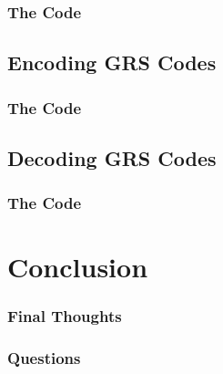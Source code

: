 \documentclass{beamer}
\begin{document}
\begin{frame}
	\frametitle{The Code}
\end{frame}

\subsection{Encoding GRS Codes}

\begin{frame}
	\frametitle{The Code}
\end{frame}

\subsection{Decoding GRS Codes}

\begin{frame}
	\frametitle{The Code}
\end{frame}

\section{Conclusion}

\begin{frame}
	\frametitle{Final Thoughts}
\end{frame}

\begin{frame}
	\frametitle{Questions}
\end{frame}
\end{document}
